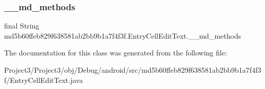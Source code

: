 \subsubsection{\texorpdfstring{\+\_\+\+\_\+md\+\_\+methods}{\_\_md\_methods}}
{\footnotesize\ttfamily final String md5b60ffeb829f638581ab2bb9b1a7f4f3f.\+Entry\+Cell\+Edit\+Text.\+\_\+\+\_\+md\+\_\+methods\hspace{0.3cm}{\ttfamily [static]}}



The documentation for this class was generated from the following file\+:\begin{DoxyCompactItemize}
\item 
Project3/\+Project3/obj/\+Debug/android/src/md5b60ffeb829f638581ab2bb9b1a7f4f3f/Entry\+Cell\+Edit\+Text.\+java\end{DoxyCompactItemize}
